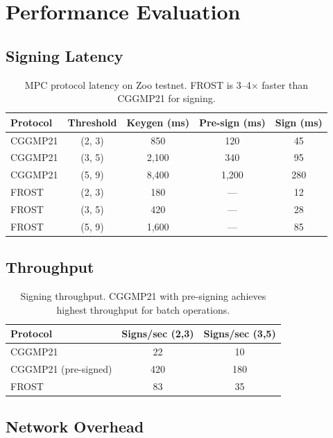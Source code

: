 \section{Performance Evaluation}

\label{sec:evaluation}

\subsection{Signing Latency}

\begin{table}[t]
\centering
\begin{tabular}{lcccc}
\toprule
\textbf{Protocol} & \textbf{Threshold} & \textbf{Keygen (ms)} & \textbf{Pre-sign (ms)} & \textbf{Sign (ms)} \\
\midrule
CGGMP21 & (2, 3) & 850 & 120 & 45 \\
CGGMP21 & (3, 5) & 2,100 & 340 & 95 \\
CGGMP21 & (5, 9) & 8,400 & 1,200 & 280 \\
FROST & (2, 3) & 180 & --- & 12 \\
FROST & (3, 5) & 420 & --- & 28 \\
FROST & (5, 9) & 1,600 & --- & 85 \\
\bottomrule
\end{tabular}
\caption{MPC protocol latency on Zoo testnet. FROST is 3--4$\times$ faster than CGGMP21 for signing.}
\label{tab:latency}
\end{table}

\subsection{Throughput}

\begin{table}[t]
\centering
\begin{tabular}{lcc}
\toprule
\textbf{Protocol} & \textbf{Signs/sec (2,3)} & \textbf{Signs/sec (3,5)} \\
\midrule
CGGMP21 & 22 & 10 \\
CGGMP21 (pre-signed) & 420 & 180 \\
FROST & 83 & 35 \\
\bottomrule
\end{tabular}
\caption{Signing throughput. CGGMP21 with pre-signing achieves highest throughput for batch operations.}
\label{tab:throughput}
\end{table}

\subsection{Network Overhead}

